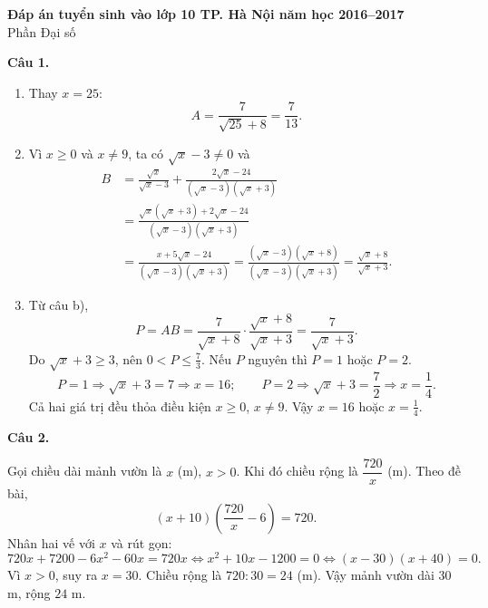 \documentclass[12pt,a4paper]{article}
\begin{document}
\begin{center}
{\Large\bfseries Đáp án tuyển sinh vào lớp 10 TP. Hà Nội năm học 2016--2017}\\
{\large Phần Đại số}
\end{center}

\textbf{Câu 1.}
\begin{enumerate}[label=\alph*)]
\item Thay $x=25$:
\[
A=\frac{7}{\sqrt{25}+8}=\frac{7}{13}.
\]
\item Vì $x\ge0$ và $x\ne9$, ta có $\sqrt{x}-3\ne0$ và
\begin{align*}
B&=\frac{\sqrt{x}}{\sqrt{x}-3}+\frac{2\sqrt{x}-24}{(\sqrt{x}-3)(\sqrt{x}+3)}\\
 &=\frac{\sqrt{x}(\sqrt{x}+3)+2\sqrt{x}-24}{(\sqrt{x}-3)(\sqrt{x}+3)}\\
 &=\frac{x+5\sqrt{x}-24}{(\sqrt{x}-3)(\sqrt{x}+3)}
 =\frac{(\sqrt{x}-3)(\sqrt{x}+8)}{(\sqrt{x}-3)(\sqrt{x}+3)}
 =\frac{\sqrt{x}+8}{\sqrt{x}+3}.
\end{align*}
\item Từ câu b),
\[
P=AB=\frac{7}{\sqrt{x}+8}\cdot\frac{\sqrt{x}+8}{\sqrt{x}+3}
 =\frac{7}{\sqrt{x}+3}.
\]
Do $\sqrt{x}+3\ge3$, nên $0<P\le\frac73$. Nếu $P$ nguyên thì $P=1$ hoặc $P=2$.
\[
P=1\Rightarrow \sqrt{x}+3=7\Rightarrow x=16;
\qquad
P=2\Rightarrow \sqrt{x}+3=\frac72\Rightarrow x=\frac14.
\]
Cả hai giá trị đều thỏa điều kiện $x\ge0$, $x\ne9$. Vậy $x=16$ hoặc $x=\frac14$.
\end{enumerate}

\textbf{Câu 2.}

Gọi chiều dài mảnh vườn là $x$ (m), $x>0$. Khi đó chiều rộng là $\dfrac{720}{x}$ (m). Theo đề bài,
\[
(x+10)\left(\frac{720}{x}-6\right)=720.
\]
Nhân hai vế với $x$ và rút gọn:
\[
720x+7200-6x^2-60x=720x
\Longleftrightarrow x^2+10x-1200=0
\Longleftrightarrow (x-30)(x+40)=0.
\]
Vì $x>0$, suy ra $x=30$. Chiều rộng là $720:30=24$ (m). Vậy mảnh vườn dài $30$ m, rộng $24$ m.
\end{document}
